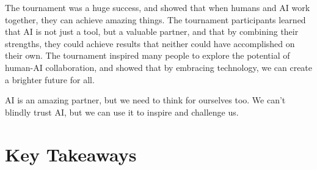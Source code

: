 The tournament was a huge success, and showed that when humans and AI work together, they can achieve amazing things. The tournament participants learned that AI is not just a tool, but a valuable partner, and that by combining their strengths, they could achieve results that neither could have accomplished on their own. The tournament inspired many people to explore the potential of human-AI collaboration, and showed that by embracing technology, we can create a brighter future for all.

AI is an amazing partner, but we need to think for ourselves too. We can't blindly trust AI, but we can use it to inspire and challenge us.

\section{Key Takeaways}

